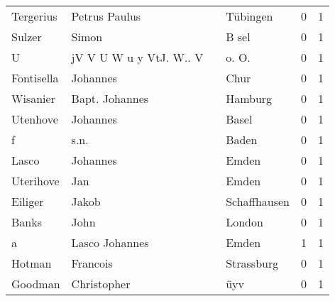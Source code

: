 \begin{center}
\begin{tiny}
\begin{longtabu}{llllrr}
                Tergerius &                      Petrus Paulus &             &                                    Tübingen &          0 &         1 \\
                   Sulzer &                              Simon &             &                                       B sel &          0 &         1 \\
                        U &            jV V U W u y VtJ. W.. V &             &                                      o. O.  &          0 &         1 \\
               Fontisella &                           Johannes &             &                                        Chur &          0 &         1 \\
                 Wisanier &                     Bapt. Johannes &             &                                     Hamburg &          0 &         1 \\
                 Utenhove &                           Johannes &             &                                       Basel &          0 &         1 \\
                        f &                               s.n. &             &                                       Baden &          0 &         1 \\
                    Lasco &                           Johannes &             &                                       Emden &          0 &         1 \\
                Uterihove &                                Jan &             &                                       Emden &          0 &         1 \\
                  Eiliger &                              Jakob &             &                                Schaffhausen &          0 &         1 \\
                    Banks &                               John &             &                                      London &          0 &         1 \\
                        a &                     Lasco Johannes &             &                                       Emden &          1 &         1 \\
                   Hotman &                           Francois &             &                                  Strassburg &          0 &         1 \\
                  Goodman &                        Christopher &             &                                         üyv &          0 &         1 \\

\end{longtabu}
\end{tiny}
\end{center}

